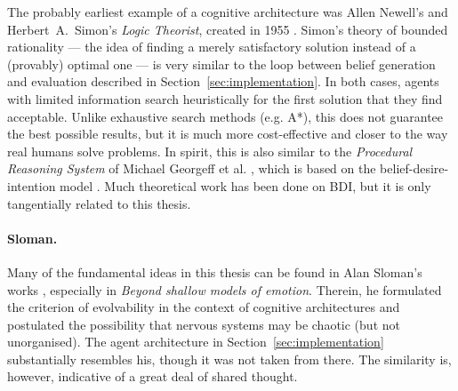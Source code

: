 The probably earliest example of a cognitive architecture was Allen Newell's and Herbert~A.~Simon's {\em Logic Theorist}, created in 1955 \cite[p.\ 44]{crevier93}. Simon's theory of bounded rationality \cite{Gigerenzer2001} --- the idea of finding a merely satisfactory solution instead of a (provably) optimal one --- is very similar to the loop between belief generation and evaluation described in Section~\ref{sec:implementation}. In both cases, agents with limited information search heuristically for the first solution that they find acceptable. Unlike exhaustive search methods (e.g. A*), this does not guarantee the best possible results, but it is much more cost-effective and closer to the way real humans solve problems. In spirit, this is also similar to the {\em Procedural Reasoning System} of Michael Georgeff et al. \cite{pcs}, which is based on the belief-desire-intention model \cite{Rao95bdiagents, Bratman87}. Much theoretical work has been done on BDI, but it is only tangentially related to this thesis.

\paragraph{Sloman.} Many of the fundamental ideas in this thesis can be found in Alan Sloman's works \cite{sloman1993, sloman1997, sloman1999, sloman2000, slomanSimAgent}, especially in {\em Beyond shallow models of emotion}. Therein, he formulated the criterion of evolvability in the context of cognitive architectures and postulated the possibility that nervous systems may be chaotic (but not unorganised). The agent architecture in Section~\ref{sec:implementation} substantially resembles his, though it was not taken from there. The similarity is, however, indicative of a great deal of shared thought.

